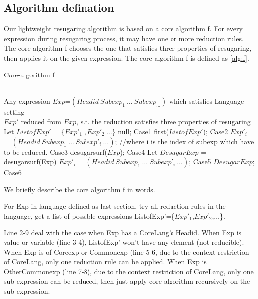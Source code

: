 \subsection{Algorithm defination}

Our lightweight resugaring algorithm is based on a core algorithm f. For every expression during resugaring process, it may have one or more reduction rules. The core algorithm f chooses the one that satisfies three properties of resugaring, then applies it on the given expression. The core algorithm f is defined as \ref{alg:f}.
\begin{algorithm}
	\caption{Core-algorithm f}
	\label{alg:f}     %
	\begin{algorithmic}[1]       %
		\REQUIRE ~~\\      %
		Any expression $Exp$=$(Headid~Subexp_{1}~\ldots~Subexp_{\ldots})$ which satisfies Language setting
		\ENSURE ~~\\     %
		$Exp'$ reduced from $Exp$, s.t. the reduction satisfies three properties of resugaring
		\STATE     Let $ListofExp'$ = $\{Exp'_{1}\;,Exp'_{2}~\ldots\}$
		\RETURN null; \hfill Case1
		\RETURN first($ListofExp'$); \hfill Case2
		\ELSE 
		\RETURN $Exp'_{i}$ = $(Headid~Subexp_{1}~\ldots~Subexp'_{i}~\ldots)$; //where i is the index of subexp which have to be reduced. \hfill Case3
		\ENDIF
		\ELSE 
		\RETURN desugarsurf($Exp$); \hfill Case4
		\ELSE
		\STATE Let $DesugarExp$ = desugarsurf(Exp)
		\RETURN $Exp'_{i}$ = $(Headid~Subexp_{1}~\ldots~Subexp'_{i}~\ldots)$; \hfill Case5
		\ELSE
		\RETURN $DesugarExp$; \hfill Case6
		\ENDIF
		\ENDIF
		\ENDIF
		
	\end{algorithmic}
\end{algorithm}

We briefly describe the core algorithm f in words.

For Exp in language defined as last section, try all reduction rules in the language, get a list of possible expressions ListofExp'=\{$Exp'_{1}$,$Exp'_{2}$,$\ldots$\}. 

Line 2-9 deal with the case when Exp has a CoreLang's Headid. When Exp is value or variable (line 3-4), ListofExp' won't have any element (not reducible). When Exp is of Coreexp or Commonexp (line 5-6, due to the context restriction of CoreLang, only one reduction rule can be applied. When Exp is OtherCommonexp (line 7-8), due to the context restriction of CoreLang, only one sub-expression can be reduced, then just apply core algorithm recursively on the sub-expression.

